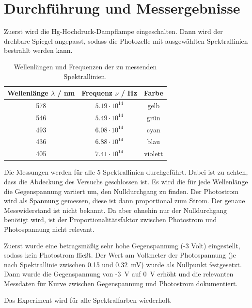 \documentclass{article}
\begin{document}
\newpage

\section{Durchführung und Messergebnisse}

Zuerst wird die Hg-Hochdruck-Dampflampe eingeschalten. Dann wird der drehbare Spiegel angepasst, sodass die Photozelle mit ausgewählten Spektrallinien bestrahlt werden kann.
\begin{table}[H]
\caption{Wellenlängen und Frequenzen der zu messenden Spektrallinien.}
\begin{tabular}{ccc}
Wellenlänge $\lambda$ / nm & Frequenz $\nu$ / Hz & Farbe \\
\hline
578 & $5.19 \cdot 10^{14}$ & gelb \\
546 & $5.49 \cdot 10^{14}$ & grün \\
493 & $6.08 \cdot 10^{14}$ & cyan \\
436 & $6.88 \cdot 10^{14}$ & blau \\
405 & $7.41 \cdot 10^{14}$ & violett
\end{tabular}
\end{table}

Die Messungen werden für alle 5 Spektrallinien durchgeführt. Dabei ist zu achten, dass die Abdeckung des Versuchs geschlossen ist. Es wird die für jede Wellenlänge die Gegenspannung variiert um, den Nulldurchgang zu finden. Der Photostrom wird als Spannung gemessen, diese ist dann proportional zum Strom. Der genaue Messwiderstand ist nicht bekannt. Da aber ohnehin nur der Nulldurchgang benötigt wird, ist der Proportionalitätsfaktor zwischen Photostrom und Photospannung nicht relevant.

Zuerst wurde eine betragsmäßig sehr hohe Gegenspannung (-3 Volt) eingestellt, sodass kein Photostrom fließt. Der Wert am Voltmeter der Photospannung (je nach Spektrallinie zwischen 0.15 und 0.32~mV) wurde als Nullpunkt festgesetzt. Dann wurde die Gegenspannung von -3~V auf 0~V erhöht und die relevanten Messdaten für Kurve zwischen Gegenspannung und Photostrom dokumentiert.

Das Experiment wird für alle Spektralfarben wiederholt.
\end{document}
